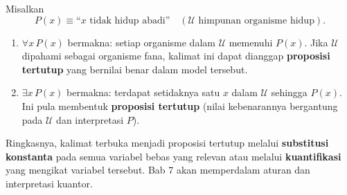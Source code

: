 \begin{contoh}
Misalkan
\[ P(x) \equiv \text{``}x \text{ tidak hidup abadi''} \quad (\mathcal{U} \text{ himpunan organisme hidup}). \]

\begin{enumerate}
    \item $\forall x\, P(x)$ bermakna: setiap organisme dalam $\mathcal{U}$ memenuhi $P(x)$. Jika $\mathcal{U}$ dipahami sebagai organisme fana, kalimat ini dapat dianggap \textbf{proposisi tertutup} yang bernilai benar dalam model tersebut.

    \item $\exists x\, P(x)$ bermakna: terdapat setidaknya satu $x$ dalam $\mathcal{U}$ sehingga $P(x)$. Ini pula membentuk \textbf{proposisi tertutup} (nilai kebenarannya bergantung pada $\mathcal{U}$ dan interpretasi $P$).
\end{enumerate}
\end{contoh}

Ringkasnya, kalimat terbuka menjadi proposisi tertutup melalui \textbf{substitusi konstanta} pada semua variabel bebas yang relevan atau melalui \textbf{kuantifikasi} yang mengikat variabel tersebut. Bab 7 akan memperdalam aturan dan interpretasi kuantor.
